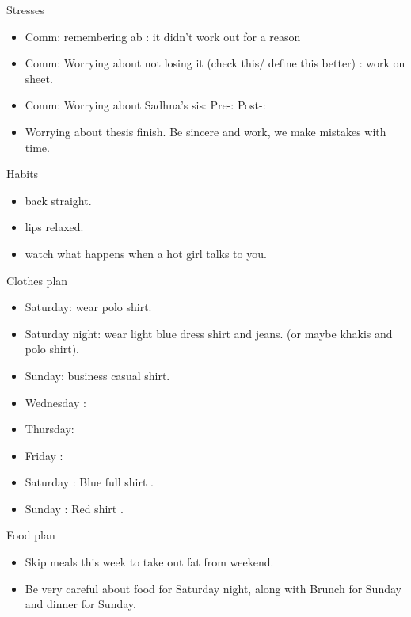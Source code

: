 \documentclass[serif, mathserif, final]{beamer}
\begin{document}
\begin{frame}{}
\begin{columns}
\begin{column}{0.25\linewidth}
\begin{block}{ Stresses}
\begin{itemize}
    \item \tiny Comm: remembering ab : it didn't work out for a reason 
    \item \tiny Comm: Worrying about not losing it (check this/ define this better) : work on sheet. 
    \item \tiny Comm: Worrying about Sadhna's sis: Pre-: Post-: 
    \item \tiny Worrying about thesis finish. Be sincere and work, we make mistakes with time. 
    \end{itemize} 
  \end{block} 

  \begin{block}{ Habits } 
    \begin{itemize} 
      \tiny \item \tiny back straight. 
    \item \tiny lips relaxed. 
    \item \tiny watch what happens when a hot girl talks to you. 
    \end{itemize} 
  \end{block} 

  \begin{block}{Clothes plan} 
    \begin{itemize} 
      \tiny \item \tiny Saturday: wear polo shirt. 
    \item \tiny Saturday night: wear light blue dress shirt and jeans. (or maybe khakis and polo shirt). 
    \item \tiny Sunday: business casual shirt. 
    \item \tiny Wednesday : 
    \item \tiny Thursday: 
    \item \tiny Friday : 
    \item \tiny Saturday : Blue full shirt . 
    \item \tiny Sunday : Red shirt .
    \end{itemize} 
  \end{block} 
  \begin{block}{ Food plan } 
    \begin{itemize} 
      \tiny \item \tiny Skip meals this week to take out fat from weekend. 
    \item \tiny Be very careful about food for Saturday night, along with Brunch for Sunday and dinner for Sunday. 
    \end{itemize} 
  \end{block} 


\end{column}
\end{columns}
\end{frame}
\end{document}
